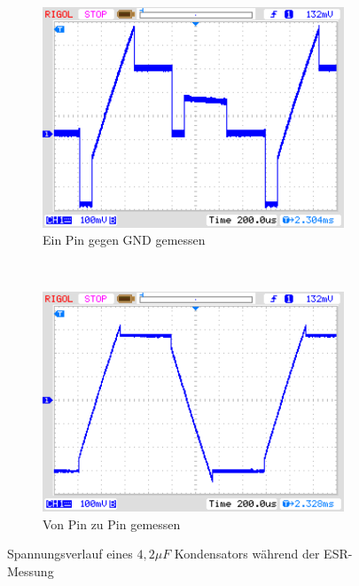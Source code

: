 \begin{figure}[H]
  \begin{subfigure}[b]{9cm}
    \centering
    \includegraphics[width=9cm]{../PNG/ESR_4uF.png}
    \caption{Ein Pin gegen GND gemessen}
  \end{subfigure}
  ~
  \begin{subfigure}[b]{9cm}
    \centering
    \includegraphics[width=9cm]{../PNG/ESR4uF6R8.png}
    \caption{Von Pin zu Pin gemessen}
  \end{subfigure}
  \caption{Spannungsverlauf eines \(4,2\mu F\) Kondensators während der ESR-Messung}
  \label{pic:esr4}
\end{figure}

